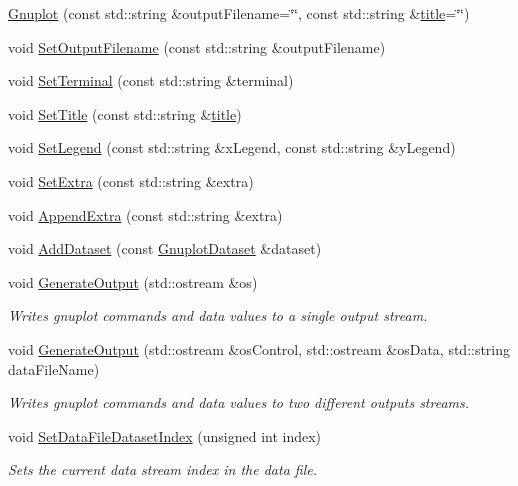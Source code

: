 \begin{DoxyCompactItemize}
\item 
\hyperlink{classns3_1_1Gnuplot_ab0ac97745b530ae7526e1174effb3099}{Gnuplot} (const std\+::string \&output\+Filename=\char`\"{}\char`\"{}, const std\+::string \&\hyperlink{lte__link__budget__x2__handover__measures_8m_a3f4b991df405379f6917e1683ed5a8c8}{title}=\char`\"{}\char`\"{})
\item 
void \hyperlink{classns3_1_1Gnuplot_ac25249599cf235d9e323940e6c2b78f9}{Set\+Output\+Filename} (const std\+::string \&output\+Filename)
\item 
void \hyperlink{classns3_1_1Gnuplot_a50cfef476972d6abace3dc6a6f72e7ec}{Set\+Terminal} (const std\+::string \&terminal)
\item 
void \hyperlink{classns3_1_1Gnuplot_ac01f15633d49f0239f8a45293a1e04f0}{Set\+Title} (const std\+::string \&\hyperlink{lte__link__budget__x2__handover__measures_8m_a3f4b991df405379f6917e1683ed5a8c8}{title})
\item 
void \hyperlink{classns3_1_1Gnuplot_a409069caf3227b213bdbb6bc303058b1}{Set\+Legend} (const std\+::string \&x\+Legend, const std\+::string \&y\+Legend)
\item 
void \hyperlink{classns3_1_1Gnuplot_ab87336c31937b7083fda6a966488bb4c}{Set\+Extra} (const std\+::string \&extra)
\item 
void \hyperlink{classns3_1_1Gnuplot_a649a3041b9d0ea21a212b5ad9b28ecbf}{Append\+Extra} (const std\+::string \&extra)
\item 
void \hyperlink{classns3_1_1Gnuplot_a306ec724a327cf9ab699700f31fca0a1}{Add\+Dataset} (const \hyperlink{classns3_1_1GnuplotDataset}{Gnuplot\+Dataset} \&dataset)
\item 
void \hyperlink{classns3_1_1Gnuplot_a6cd487453f61e2405cc7cc9c80dc0cf2}{Generate\+Output} (std\+::ostream \&os)
\begin{DoxyCompactList}\small\item\em Writes gnuplot commands and data values to a single output stream. \end{DoxyCompactList}\item 
void \hyperlink{classns3_1_1Gnuplot_a45f56fc48840f95ce27d119176ba38db}{Generate\+Output} (std\+::ostream \&os\+Control, std\+::ostream \&os\+Data, std\+::string data\+File\+Name)
\begin{DoxyCompactList}\small\item\em Writes gnuplot commands and data values to two different outputs streams. \end{DoxyCompactList}\item 
void \hyperlink{classns3_1_1Gnuplot_a913caef5e3761111a532e72b25aa6f72}{Set\+Data\+File\+Dataset\+Index} (unsigned int index)
\begin{DoxyCompactList}\small\item\em Sets the current data stream index in the data file. \end{DoxyCompactList}\end{DoxyCompactItemize}
